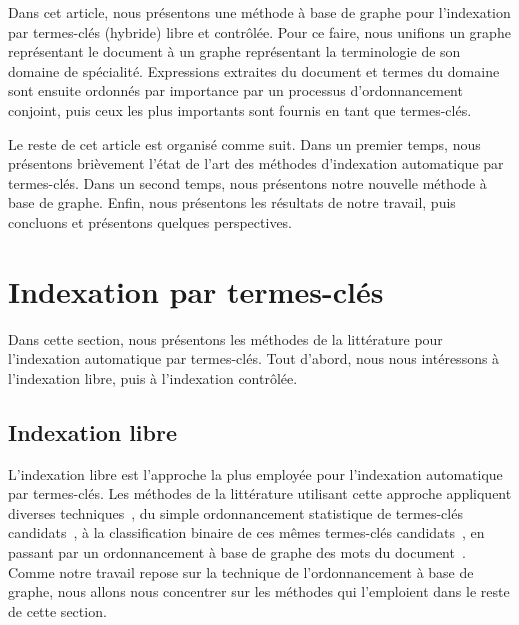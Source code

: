   Dans cet article, nous présentons une méthode à base de graphe pour
  l'indexation par termes-clés (hybride) libre et contrôlée. Pour ce faire, nous
  unifions un graphe représentant le document à un graphe représentant la
  terminologie de son domaine de spécialité. Expressions extraites du document
  et termes du domaine sont ensuite ordonnés par importance par un processus
  d'ordonnancement conjoint, puis ceux les plus importants sont fournis en tant
  que termes-clés.

  Le reste de cet article est organisé comme suit. Dans un premier temps, nous
  présentons brièvement l'état de l'art des méthodes d'indexation automatique
  par termes-clés. Dans un second temps, nous présentons notre nouvelle méthode
  à base de graphe. Enfin, nous présentons les résultats de notre travail, puis
  concluons et présentons quelques perspectives.


\section{Indexation par termes-clés}
\label{sec:main-domain_specific_keyphrase_annotation-state_of_the_art}
  Dans cette section, nous présentons les méthodes de la littérature pour
  l'indexation automatique par termes-clés. Tout d'abord, nous nous intéressons
  à l'indexation libre, puis à l'indexation contrôlée.

  \subsection{Indexation libre}
  \label{subsec:main-domain_specific_keyphrase_annotation-state_of_the_art-keyphrase_extraction}
    L'indexation libre est l'approche la plus employée pour l'indexation
    automatique par termes-clés. Les méthodes de la littérature utilisant cette
    approche appliquent diverses techniques~\cite{hasan2014state_of_the_art}, du
    simple ordonnancement statistique de termes-clés
    candidats~\cite{salton1975tfidf}, à la classification binaire de ces mêmes
    termes-clés candidats~\cite{witten1999kea}, en passant par un ordonnancement
    à base de graphe des mots du document~\cite{mihalcea2004textrank}. Comme
    notre travail repose sur la technique de l'ordonnancement à base de graphe,
    nous allons nous concentrer sur les méthodes qui l'emploient dans le reste
    de cette section.

